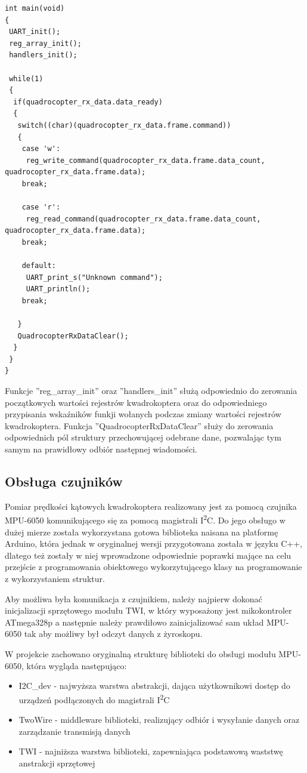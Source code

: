 \begin{lstlisting}
int main(void)
{
 UART_init();
 reg_array_init();
 handlers_init();

 while(1)
 {
  if(quadrocopter_rx_data.data_ready)
  {
   switch((char)(quadrocopter_rx_data.frame.command))
   {
    case 'w':
     reg_write_command(quadrocopter_rx_data.frame.data_count, quadrocopter_rx_data.frame.data);
    break;
				
    case 'r':
     reg_read_command(quadrocopter_rx_data.frame.data_count, quadrocopter_rx_data.frame.data);
    break;

    default:
     UART_print_s("Unknown command");
     UART_println();
    break;

   }
   QuadrocopterRxDataClear();
  }
 }
}
\end{lstlisting}

Funkcje ''reg\_array\_init'' oraz ''handlers\_init'' służą odpowiednio do zerowania początkowych wartości rejestrów kwadrokoptera oraz do odpowiedniego przypisania wskaźników funkji wołanych podczas zmiany wartości rejestrów kwadrokoptera. Funkcja ''QuadrocopterRxDataClear'' służy do zerowania odpowiednich pól struktury przechowującej odebrane dane, pozwalając tym samym na prawidłowy odbiór następnej wiadomości.

\subsection{Obsługa czujników}

Pomiar prędkości kątowych kwadrokoptera realizowany jest za pomocą czujnika MPU-6050 komunikującego się za pomocą magistrali I\textsuperscript{2}C. Do jego obsługo w dużej mierze została wykorzystana gotowa biblioteka naisana na platformę Arduino, która jednak w oryginalnej wersji przygotowana została w języku C++, dlatego też zostały w niej wprowadzone odpowiednie poprawki mające na celu przejście z programowania obiektowego wykorzytującego klasy na programowanie z wykorzystaniem struktur. 

Aby możliwa była komunikacja z czujnikiem, należy najpierw dokonać inicjalizacji sprzętowego modułu TWI, w który wyposażony jest mikokontroler ATmega328p a następnie należy prawdiłowo zainicjalizować sam układ MPU-6050 tak aby możliwy był odczyt danych z żyroskopu.

W projekcie zachowano oryginalną strukturę biblioteki do obsługi modułu MPU-6050, która wygląda następująco:
\begin{itemize}
	\item I2C\_dev - najwyższa warstwa abstrakcji, dająca użytkownikowi dostęp do urządzeń podłączonych do magistrali I\textsuperscript{2}C
	\item TwoWire - middleware biblioteki, realizujący odbiór i wysyłanie danych oraz zarządzanie transmisją danych
	\item TWI - najniższa warstwa biblioteki, zapewniająca podstawową waststwę anstrakcji sprzętowej
\end{itemize}

